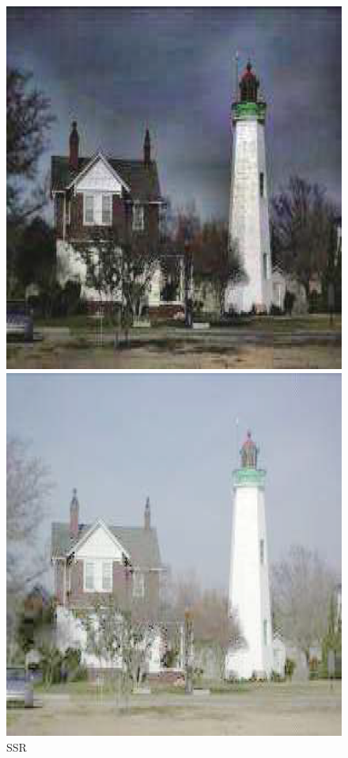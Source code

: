 \documentclass[CJK,aspectratio=169]{beamer}  %
\begin{document}
\begin{frame}
\begin{figure}[htbp]
\begin{minipage}{0.18\textwidth}
				\captionsetup{font=scriptsize}
				\caption*{\tiny \textcolor{blue}{\citep{cooper2004analysis}}}
				\label{fig: Retinex Model_Retinex}
			\end{minipage}
			\begin{minipage}{0.18\textwidth}
				\includegraphics[width=\linewidth]{picture/LLIE/Retinex Model/SSR}
				\captionsetup{font=scriptsize}
				\caption*{\tiny SSR}
				\label{fig: Retinex Model_SSR}	
			\end{minipage}
			\begin{minipage}{0.18\textwidth}
				\includegraphics[width=\linewidth]{picture/LLIE/Retinex Model/MSR}

\end{minipage}
\end{figure}
\end{frame}
\end{document}
